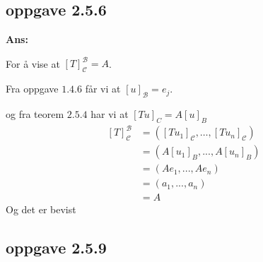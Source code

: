 \documentclass[11pt]{article}
\newenvironment{solbox}
  {\begin{mdframed}[linewidth=1pt,linecolor=black,roundcorner=5pt]
   \noindent\textbf{Ans: }\enspace}
  {\end{mdframed}}
\begin{document}
\subsection{oppgave 2.5.6}

\begin{solbox}

  For å vise at $ \left[ T \right]_{ \mathcal{C} }^{ \mathcal{B} } = A $.

  Fra oppgave $1.4.6$ får vi at $ \left[ u \right]_{ \mathcal{B} } = e_j $.
  
  og fra teorem $ 2.5.4 $ har vi at $ \left[ Tu \right] _C=A \left[ u \right] _B $  
  \begin{align*}
    \left[ T \right]_{ \mathcal{C} }^{ \mathcal{B} }
      &= \left( \left[ Tu_1 \right]_{ \mathcal{C} }, \dots, \left[ Tu_n \right]_{ \mathcal{C} } \right) \\
      &= \left( A\left[ u_1 \right] _B, ...,A \left[ u_n \right] _B \right) \\
      &= \left( Ae_1, ..., Ae_n \right) \\
      &= \left( a_1, ..., a_n \right) \\
      &= A
  \end{align*}
  Og det er bevist

\end{solbox}


\subsection{oppgave 2.5.9}
\end{document}
